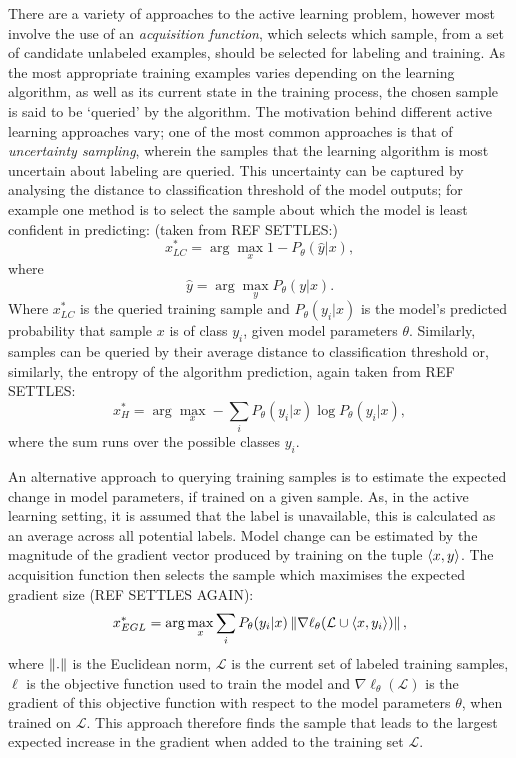There are a variety of approaches to the active learning problem, however most involve the use of an \textit{acquisition function}, which selects which sample, from a set of candidate unlabeled examples, should be selected for labeling and training. As the most appropriate training examples varies depending on the learning algorithm, as well as its current state in the training process, the chosen sample is said to be `queried' by the algorithm. The motivation behind different active learning approaches vary; one of the most common approaches is that of \textit{uncertainty sampling}, wherein the samples that the learning algorithm is most uncertain about labeling are queried. This uncertainty can be captured by analysing the distance to classification threshold of the model outputs; for example one method is to select the sample about which the model is least confident in predicting: (taken from REF SETTLES:)
\begin{equation}
x^{*}_{LC} = \arg\max_{x} 1 - P_{\theta}(\hat{y}|x),
\end{equation}
where
\begin{equation}
\hat{y} = \arg\max_{y}P_{\theta}(y|x).
\end{equation}
Where $x^{*}_{LC}$ is the queried training sample and $P_{\theta}(y_{i}|x)$ is the model's predicted probability that sample $x$ is of class $y_{i}$, given model parameters $\theta$. Similarly, samples can be queried by their average distance to classification threshold or, similarly, the entropy of the algorithm prediction, again taken from REF SETTLES:
\begin{equation}
x^{*}_{H} = \arg\max_{x} - \sum_{i} P_{\theta}(y_i|x)\log P_{\theta}(y_i|x),
\end{equation}
where the sum runs over the possible classes $y_i$.

An alternative approach to querying training samples is to estimate the expected change in model parameters, if trained on a given sample. As, in the active learning setting, it is assumed that the label is unavailable, this is calculated as an average across all potential labels. Model change can be estimated by the magnitude of the gradient vector produced by training on the tuple $\braket{x,y}$. The acquisition function then selects the sample which maximises the expected gradient size (REF SETTLES AGAIN):
\begin{equation}
x^{*}_{EGL} = \arg\max_{x} \sum_{i} P_{\theta}(y_i|x) \left\lVert\nabla \ell_{\theta}(\mathcal{L} \cup \braket{x,y_{i}})\right\rVert,
\end{equation}
where $\left\lVert.\right\rVert$ is the Euclidean norm, $\mathcal{L}$ is the current set of labeled training samples, $\ell$ is the objective function used to train the model and $\nabla \ell_{\theta}(\mathcal{L})$ is the gradient of this objective function with respect to the model parameters $\theta$, when trained on $\mathcal{L}$. This approach therefore finds the sample that leads to the largest expected increase in the gradient when added to the training set $\mathcal{L}$.

